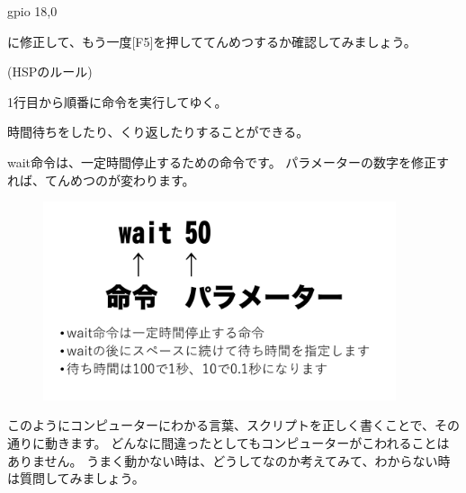 \begin{description}
    \item gpio 18,0
\end{description}
\noindent
に修正して、もう一度[F5]を押しててんめつするか確認してみましょう。

\begin{description}
    \item (HSPのルール)
\end{description}

\begin{description}
    \item 1行目から順番に命令を実行してゆく。
    \item 時間待ちをしたり、くり返したりすることができる。
\end{description}

wait命令は、一定時間停止するための命令です。
パラメーターの数字を修正すれば、てんめつのが変わります。

\begin{figure}[H]
    \begin{center}
        \includegraphics[keepaspectratio,width=10.372cm,height=5.837cm]{text02-img/text02-img026.png}
    \end{center}
\end{figure}
\noindent
このようにコンピューターにわかる言葉、スクリプトを正しく書くことで、その通りに動きます。
どんなに間違ったとしてもコンピューターがこわれることはありません。
うまく動かない時は、どうしてなのか考えてみて、わからない時は質問してみましょう。


